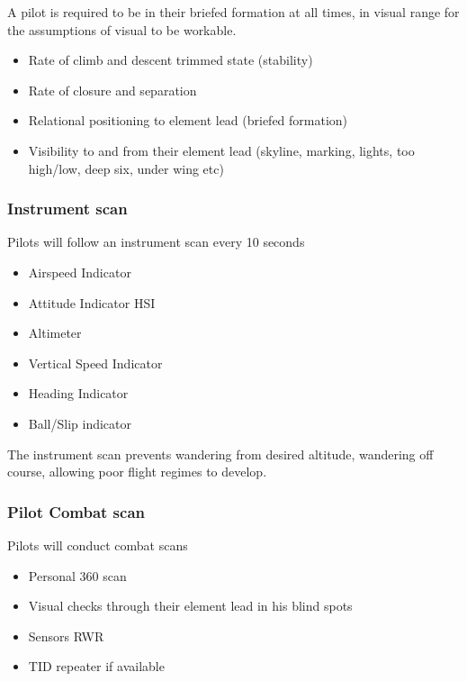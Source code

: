 A pilot is required to be in their briefed formation at all times, in visual
range for the assumptions of visual to be workable.

\begin{itemize}

  \item Rate of climb and descent trimmed state (stability)

  \item Rate of closure and separation

  \item Relational positioning to element lead (briefed formation)

  \item Visibility to and from their element lead (skyline, marking, lights,
    too high/low, deep six, under wing etc)

\end{itemize}

\subsubsection{Instrument scan}

Pilots will follow an instrument scan every 10 seconds

\begin{itemize}
  \item Airspeed Indicator
  \item Attitude Indicator HSI
  \item Altimeter
  \item Vertical Speed Indicator
  \item Heading Indicator
  \item Ball/Slip indicator
\end{itemize}

The instrument scan prevents wandering from desired altitude, wandering off
course, allowing poor flight regimes to develop.

\subsubsection{Pilot Combat scan}

Pilots will conduct combat scans

\begin{itemize}
  \item Personal 360 scan
  \item Visual checks through their element lead in his blind spots
  \item Sensors RWR
  \item TID repeater if available
\end{itemize}

